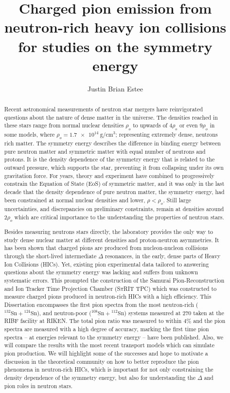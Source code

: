 \documentclass{altmsuphddissertation}
\author{Justin Brian Estee} %
\title{Charged pion emission from neutron-rich heavy ion collisions for studies on the symmetry energy} %
\newcommand{\spirit}{S$\pi$RIT }
\newcommand{\tin}[2]{{}^{#1}\mathrm{Sn} + {}^{#2}\mathrm{Sn}}
\begin{document}
\frontmatter
\maketitlepage %
\begin{abstract}

Recent astronomical measurements of neutron star mergers have reinvigorated questions about the nature of dense matter in the universe. The densities reached in these stars range from normal nuclear densities $\rho_o$ to upwards of $4\rho_o$ or even $9\rho_o$ in some models, where $\rho_o = \SI{1.7e14}{\gram\per\centi\metre\cubed}$; representing extremely dense, neutrons rich matter. The symmetry energy describes the difference in binding energy between pure neutron matter and symmetric matter with equal number of neutrons and protons. It is the density dependence of the symmetry energy that is related to the outward pressure, which supports the star, preventing it from collapsing under its own gravitation force. For years, theory and experiment  have combined to progressively constrain the Equation of State (EoS) of symmetric matter, and it was only in the last decade that the density dependence of pure neutron matter, the symmetry energy, had been constrained at normal nuclear densities and lower, $\rho < \rho_o$. Still large uncertainties, and discrepancies on preliminary constraints, remain at densities around 2$\rho_o$ which are critical importance to the understanding the properties of neutron stars.

Besides measuring neutrons stars directly, the laboratory provides the only way to study dense nuclear matter at different densities and proton-neutron asymmetries. It has been shown that charged pions are produced from nucleon-nucleon collisions through the short-lived intermediate $\Delta$ resonances, in the early, dense parts of Heavy Ion Collisions (HICs). Yet, existing pion experimental data tailored to answering questions about the symmetry energy was lacking and suffers from unknown systematic errors. This prompted the construction of the Samurai Pion-Reconstruction and Ion Tracker Time Projection Chamber (\spirit TPC) which was constructed to measure charged pions produced in neutron-rich HICs with a high efficiency. This Dissertation encompasses the first pion spectra from the most neutron-rich ($\tin{132}{124}$), and neutron-poor ($\tin{108}{112}$) systems measured at \SI{270}{\MeVA} taken at the RIBF facility at RIKEN. The total pion ratio was measured to within 4\% and the pion spectra are measured with a high degree of accuracy, marking the first time pion spectra  -- at energies relevant to the symmetry energy -- have been published.  Also, we will compare the results with the most recent transport models which can simulate pion production. We will highlight some of the successes and hope to motivate a discussion in the theoretical community on how to better reproduce the pion phenomena in neutron-rich HICs, which is important for not only constraining the density dependence of the symmetry energy, but also for understanding the $\Delta$ and pion roles in neutron stars. 
\end{abstract}
\end{document}
